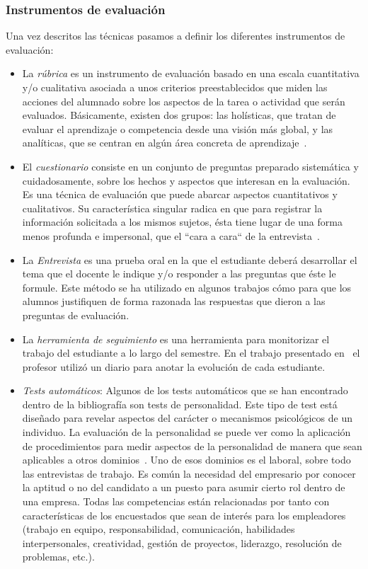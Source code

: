 \subsubsection{Instrumentos de evaluación}

Una vez descritos las técnicas pasamos a definir los diferentes instrumentos de evaluación:

\begin{itemize}
\item La \emph{rúbrica} es un instrumento de evaluación basado en una escala cuantitativa y/o cualitativa asociada a unos criterios preestablecidos que miden las acciones del alumnado sobre los aspectos de la tarea o actividad que serán evaluados.  Básicamente, existen dos grupos: las holísticas, que tratan de evaluar el aprendizaje o competencia desde una visión más global, y las analíticas, que se centran en algún área concreta de aprendizaje~\cite{torres2010rubrica}.
\item El \emph{cuestionario} consiste en un conjunto de preguntas preparado sistemática y cuidadosamente, sobre los hechos y aspectos que interesan en la evaluación.  Es una técnica de evaluación que puede abarcar aspectos cuantitativos y cualitativos. Su característica singular radica en que para registrar la información solicitada a los mismos sujetos, ésta tiene lugar de una forma menos profunda e impersonal, que el ``cara a cara`` de la entrevista~\cite{munoz2003cuestionario}. 
\item La \emph{Entrevista} es una prueba oral en la que el estudiante deberá desarrollar el tema que el docente le indique y/o responder a las preguntas que éste le formule. Este método se ha utilizado en algunos trabajos cómo \cite{ward2011developing} para que los alumnos justifiquen de forma razonada las respuestas que dieron a las preguntas de evaluación.
\item La \emph{herramienta de seguimiento} es una herramienta para monitorizar el trabajo del estudiante a lo largo del semestre. En el trabajo presentado en~\cite{lacuesta2009active} el profesor utilizó un diario para anotar la evolución de cada estudiante.
\item \emph{Tests automáticos}: Algunos de los tests automáticos que se han encontrado dentro de la bibliografía son tests de personalidad. Este tipo de test está diseñado para revelar aspectos del carácter o mecanismos psicológicos de un individuo. La evaluación de la personalidad se puede ver como la aplicación de procedimientos para medir aspectos de la personalidad de manera que sean aplicables a otros dominios~\cite{wiggins2003paradigms}. Uno de esos dominios es el laboral, sobre todo las entrevistas de trabajo. Es común la necesidad del empresario por conocer la aptitud o no del candidato a un puesto para asumir cierto rol dentro de una empresa. Todas las competencias están relacionadas por tanto con características de los encuestados que sean de interés para los empleadores (trabajo en equipo, responsabilidad, comunicación, habilidades interpersonales, creatividad, gestión de proyectos, liderazgo, resolución de problemas, etc.).

\end{itemize}
